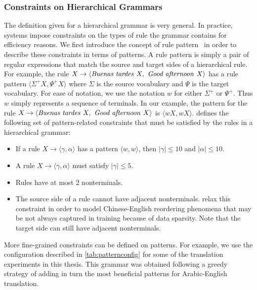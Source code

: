 \subsubsection{Constraints on Hierarchical Grammars}
\label{sec:constraintsOnHierarhicalGrammars}

The definition given for a hierarchical grammar is very general.
In practice, systems impose constraints on the types of rule the grammar contains
for efficiency reasons.
We first introduce the concept of rule
pattern~\citep{iglesias-degispert-banga-byrne:2009:EACL} in order
to describe these constraints in terms of patterns.
A rule pattern is simply a pair of regular expressions that match
the source and target sides of a hierarchical rule.
For example, the rule $X \rightarrow \langle \text{\emph{Buenas tardes }} X, \text{\emph{ Good afternoon }} X \rangle$
has a rule pattern $\langle \Sigma^+ X, \Psi^+ X \rangle$ where $\Sigma$ is the
source vocabulary and $\Psi$ is the target vocabulary.
For ease of notation, we use the notation $w$ for either $\Sigma^+$
or $\Psi^+$. Thus $w$ simply represents a sequence of terminals.
In our example, the pattern for the rule $ X \rightarrow \langle \text{\emph{Buenas tardes }} X, \text{\emph{ Good afternoon }} X \rangle$ is $\langle w X, w X \rangle$.
\citet{chiang:2007:CL} defines the following set of pattern-related constraints
that must be satisfied by the rules in a hierarchical grammar:
%
\begin{itemize}
  \item If a rule $X \rightarrow \langle \gamma, \alpha \rangle$ has a pattern $\langle w, w \rangle$, then $|\gamma| \leq 10$ and $|\alpha| \leq 10$.
  \item A rule $X \rightarrow \langle \gamma, \alpha \rangle$ must satisfy $|\gamma| \leq 5$.
  \item Rules have at most 2 nonterminals.
  \item The source side of a rule cannot have adjacent nonterminals.    
    \citet{setiawan-resnik:2010:NAACL} relax this constraint in order to model
    Chinese-English reordering phenomena that may be not always captured in
    training because of data sparsity.
    Note that the target side can still
    have adjacent nonterminals. %
  \end{itemize}
%
More fine-grained constraints can be defined on patterns.
For example, we use the configuration described
in \autoref{tab:patternconfig} for some of the translation experiments in this
thesis. This grammar was obtained following a greedy strategy of adding
in turn the most beneficial patterns for Arabic-English translation.

